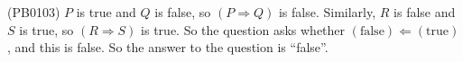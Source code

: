 (PB0103) $P$ is true and $Q$ is false, so $(P\Rightarrow Q)$ is false. Similarly, $R$ is false and $S$ is true, so $(R\Rightarrow S)$ is true. So the question asks whether $(\mbox{false})\Leftarrow(\mbox{true})$, and this is false. So the answer to the question is ``false''.
